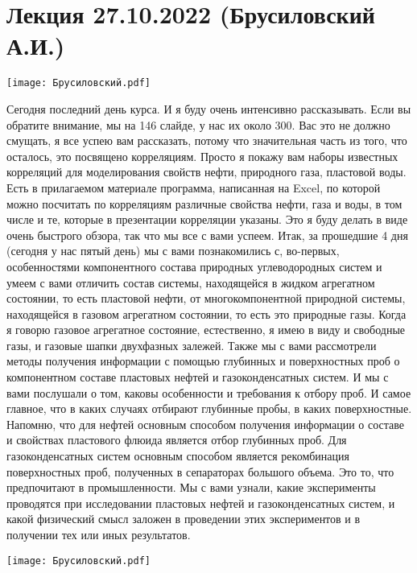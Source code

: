 \documentclass[main.tex]{subfiles}
\begin{document}
\section{Лекция 27.10.2022 (Брусиловский А.И.)}

\begin{center}
\texttt{[image: Брусиловский.pdf]}
\end{center}

Сегодня последний день курса.
И я буду очень интенсивно рассказывать.
Если вы обратите внимание, мы на 146 слайде, у нас их около 300.
Вас это не должно смущать, я все успею вам рассказать, потому что значительная часть из того, что осталось, это посвящено корреляциям.
Просто я покажу вам наборы известных корреляций для моделирования свойств нефти, природного газа, пластовой воды.
Есть в прилагаемом материале программа, написанная на Excel, по которой можно посчитать по корреляциям различные свойства нефти, газа и воды, в том числе и те, которые в презентации корреляции указаны.
Это я буду делать в виде очень быстрого обзора, так что мы все с вами успеем.
Итак, за прошедшие 4 дня (сегодня у нас пятый день) мы с вами познакомились с, во-первых, особенностями компонентного состава природных углеводородных систем и умеем с вами отличить состав системы, находящейся в жидком агрегатном состоянии, то есть пластовой нефти, от многокомпонентной природной системы, находящейся в газовом агрегатном состоянии, то есть это природные газы.
Когда я говорю газовое агрегатное состояние, естественно, я имею в виду и свободные газы, и газовые шапки двухфазных залежей.
Также мы с вами рассмотрели методы получения информации с помощью глубинных и поверхностных проб о компонентном составе пластовых нефтей и газоконденсатных систем.
И мы с вами послушали о том, каковы особенности и требования к отбору проб.
И самое главное, что в каких случаях отбирают глубинные пробы, в каких поверхностные.
Напомню, что для нефтей основным способом получения информации о составе и свойствах пластового флюида является отбор глубинных проб.
Для газоконденсатных систем основным способом является рекомбинация поверхностных проб, полученных в сепараторах большого объема.
Это то, что предпочитают в промышленности.
Мы с вами узнали, какие эксперименты проводятся при исследовании пластовых нефтей и газоконденсатных систем, и какой физический смысл заложен в проведении этих экспериментов и в получении тех или иных результатов.

\begin{center}
\texttt{[image: Брусиловский.pdf]}
\end{center}
\end{document}
